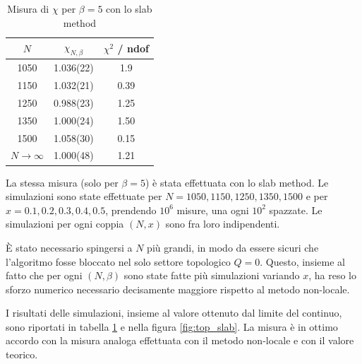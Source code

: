 \documentclass[a4paper,11pt]{article}
\begin{document}
    \begin{table}
        \centering
        \begin{tabular}{c c c} \hline
            $N$   & $\chi_{N, \beta}$    & $\chi^2$ / ndof \\ \hline
            1050    & 1.036(22)    & 1.9 \\
            1150    & 1.032(21)    & 0.39 \\
            1250    & 0.988(23)    & 1.25 \\
            1350    & 1.000(24)    & 1.50 \\
            1500    & 1.058(30)    & 0.15 \\ \hline
            $N \to \infty$ & 1.000(48) & 1.21 \\ \hline
            
        \end{tabular}
        \caption{Misura di $\chi$ per $\beta = 5$ con lo slab method}
        \label{tab:top_slab}
    \end{table}
    La stessa misura (solo per $\beta = 5$) è stata effettuata con lo slab method. Le simulazioni sono state effettuate per $N = 1050, 1150, 1250, 1350, 1500$ e per $x = 0.1, 0.2, 0.3, 0.4, 0.5$, prendendo $10^6$ misure, una ogni $10^2$ spazzate. Le simulazioni per ogni coppia $(N, x)$ sono fra loro indipendenti.
    
    È stato necessario spingersi a $N$ più grandi, in modo da essere sicuri che l'algoritmo fosse bloccato nel solo settore topologico $Q = 0$. Questo, insieme al fatto che per ogni $(N, \beta)$ sono state fatte più simulazioni variando $x$, ha reso lo sforzo numerico necessario decisamente maggiore rispetto al metodo non-locale.
    
    I risultati delle simulazioni, insieme al valore ottenuto dal limite del continuo, sono riportati in tabella \ref{tab:top_slab} e nella figura \ref{fig:top_slab}. La misura è in ottimo accordo con la misura analoga effettuata con il metodo non-locale e con il valore teorico.
    
\end{document}
